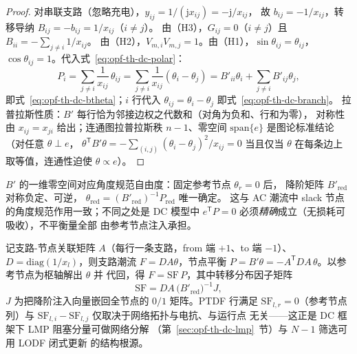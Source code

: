 \begin{proof}
对串联支路（忽略充电），$y_{ij}=1/(\mathrm jx_{ij})=-\mathrm j/x_{ij}$，
故 $b_{ij}=-1/x_{ij}$，转移导纳 $B_{ij}=-b_{ij}=1/x_{ij}$（$i\neq j$）。
由（H3），$G_{ij}=0$（$i\neq j$）且 $B_{ii}=-\sum_{j\neq i}1/x_{ij}$。
由（H2），$V_{m,i}V_{m,j}=1$。由（H1），$\sin\theta_{ij}=\theta_{ij}$，
$\cos\theta_{ij}=1$。代入式~\eqref{eq:opf-th-dc-polar}：
\begin{equation}
P_i=\sum_{j\neq i}\frac{1}{x_{ij}}\,\theta_{ij}
=\sum_{j\neq i}\frac{1}{x_{ij}}(\theta_i-\theta_j)
=B'_{ii}\theta_i+\sum_{j\neq i}B'_{ij}\theta_j ,
\end{equation}
即式~\eqref{eq:opf-th-dc-btheta}；$i$ 行代入
$\theta_{ij}=\theta_i-\theta_j$ 即式~\eqref{eq:opf-th-dc-branch}。
拉普拉斯性质：$B'$ 每行恰为邻接边权之代数和（对角为负和、行和为零），
对称性由 $x_{ij}=x_{ji}$ 给出；连通图拉普拉斯秩 $n-1$、零空间
$\mathrm{span}\{e\}$ 是图论标准结论（对任意 $\theta\perp e$，
$\theta^{\mathsf T}B'\theta=-\sum_{(i,j)}(\theta_i-\theta_j)^2/x_{ij}=0$
当且仅当 $\theta$ 在每条边上取等值，连通性迫使 $\theta\propto e$）。
\end{proof}

\begin{remark}[参考节点与唯一可解性]\label{rem:opf-th-dc-slack}
$B'$ 的一维零空间对应角度规范自由度：固定参考节点 $\theta_r=0$ 后，
降阶矩阵 $B'_{\mathrm{red}}$ 对称负定、可逆，
$\theta_{\mathrm{red}}=(B'_{\mathrm{red}})^{-1}P_{\mathrm{red}}$ 唯一确定。
这与 AC 潮流中 slack 节点的角度规范作用一致；不同之处是 DC 模型中
$e^{\mathsf T}P=0$ 必须\emph{精确}成立（无损耗可吸收），不平衡量全部
由参考节点注入承担。
\end{remark}

\begin{remark}\label{rem:opf-th-dc-ptdf}
记支路-节点关联矩阵 $A$（每行一条支路，from 端 $+1$、to 端 $-1$）、
$D=\mathrm{diag}(1/x_l)$，则支路潮流 $F=DA\theta$，节点平衡
$P=B'\theta=-A^{\mathsf T}DA\,\theta$。以参考节点为枢轴解出 $\theta$ 并
代回，得 $F=\mathrm{SF}\,P$，其中转移分布因子矩阵
\begin{equation}
\mathrm{SF}=DA\,\bigl(B'_{\mathrm{red}}\bigr)^{-1}J ,
\label{eq:opf-th-dc-ptdf}
\end{equation}
$J$ 为把降阶注入向量嵌回全节点的 $0/1$ 矩阵。PTDF 行满足
$\mathrm{SF}_{l,r}=0$（参考节点列）与
$\mathrm{SF}_{l,i}-\mathrm{SF}_{l,j}$ 仅取决于网络拓扑与电抗、与运行点
无关——这正是 DC 框架下 LMP 阻塞分量可做网络分解
（第~\ref{sec:opf-th-dc-lmp}~节）与 $N\!-\!1$ 筛选可用 LODF 闭式更新
的结构根源。
\end{remark}

